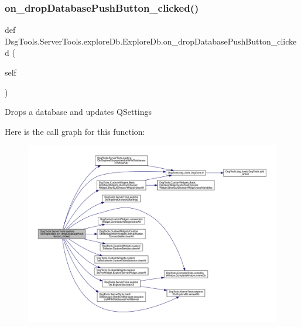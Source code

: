 \subsubsection{\texorpdfstring{on\+\_\+drop\+Database\+Push\+Button\+\_\+clicked()}{on\_dropDatabasePushButton\_clicked()}}
{\footnotesize\ttfamily def Dsg\+Tools.\+Server\+Tools.\+explore\+Db.\+Explore\+Db.\+on\+\_\+drop\+Database\+Push\+Button\+\_\+clicked (\begin{DoxyParamCaption}\item[{}]{self }\end{DoxyParamCaption})}

\begin{DoxyVerb}Drops a database and updates QSettings
\end{DoxyVerb}
 Here is the call graph for this function\+:
\nopagebreak
\begin{figure}[H]
\begin{center}
\leavevmode
\includegraphics[width=350pt]{class_dsg_tools_1_1_server_tools_1_1explore_db_1_1_explore_db_af889de9b8f68501bb60a088fe1523d5a_cgraph}
\end{center}
\end{figure}
\mbox{\label{class_dsg_tools_1_1_server_tools_1_1explore_db_1_1_explore_db_a738d6d63f19fa42032b3db3af95faf51}} 
